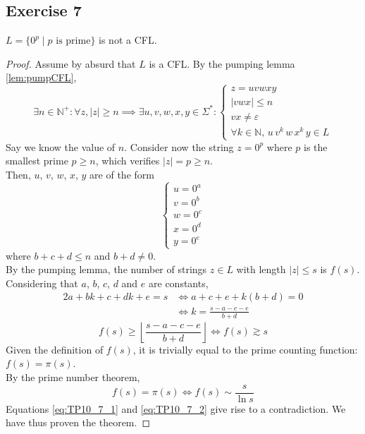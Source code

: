 {\subsection{Exercise 7}
\begin{theorem}
	$L=\{0^p\mid p \text{ is prime}\}$ is not a CFL.
\end{theorem}
\begin{proof}
Assume by absurd that $L$ is a CFL. By the pumping lemma \eqref{lem:pumpCFL},
\begin{equation*}
	\exists n \in \mathbb{N}^+ \colon \forall z, |z|\geq n \implies \exists u, v, w, x, y \in \Sigma^* \colon 
	\begin{cases}
		z=uvwxy\\
		|vwx| \leq n\\
		vx \neq \varepsilon \\
		\forall k \in \mathbb{N},\,u\,v^k\,w\,x^k\,y \in L
	\end{cases}
\end{equation*}
Say we know the value of $n$. Consider now the string $z=0^p$ where $p$ is the smallest prime $p\geq n$, which verifies $|z|=p \geq n$.\\
Then, $u$, $v$, $w$, $x$, $y$ are of the form
\begin{equation*}
	\begin{cases}
		u=0^a\\
		v=0^b\\
		w=0^c\\
		x=0^d\\
		y=0^e
	\end{cases}
\end{equation*}
where $b+c+d \leq n$ and $b+d \neq 0$.\\
By the pumping lemma, the number of strings $z\in L$ with length $|z|\leq s$ is $f(s)$.
Considering that $a$, $b$, $c$, $d$ and $e$ are constants,
\begin{alignat*}{2}
	a+bk+c+dk+e=s
	&\iff a+c+e+k(b+d)=0\\
	&\iff k           =\frac{s-a-c-e}{b+d}
\end{alignat*}
\begin{equation} \label{eq:TP10_7_1}
	f(s) \geq \left\lfloor \frac{s-a-c-e}{b+d} \right\rfloor \iff f(s) \gtrsim s
\end{equation}
Given the definition of $f(s)$, it is trivially equal to the prime counting function: $f(s)=\pi(s)$.\\
By the prime number theorem,
\begin{equation} \label{eq:TP10_7_2}
	f(s) = \pi(s) \iff f(s) \sim \frac{s}{\ln{s}}
\end{equation}
Equations \eqref{eq:TP10_7_1} and \eqref{eq:TP10_7_2} give rise to a contradiction. We have thus proven the theorem.
\end{proof}
\pagebreak
}
